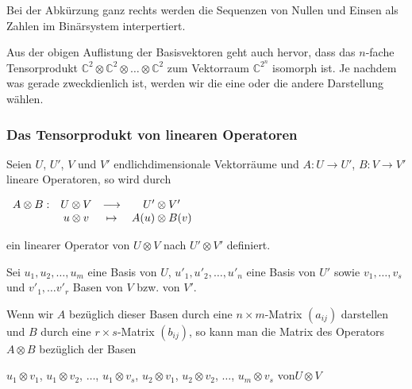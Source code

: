 \vspace{0.2cm}
\noindent Bei der Abkürzung ganz rechts werden die Sequenzen von Nullen und Einsen als Zahlen im Binärsystem interpertiert.

\noindent Aus der obigen Auflistung der Basisvektoren geht auch hervor, dass das $n$-fache Tensorprodukt $\mathbb{C}^2\otimes \mathbb{C}^2\otimes\ldots \otimes \mathbb{C}^2$ zum Vektorraum $\mathbb{C}^{2^n}$ isomorph ist. Je nachdem was gerade zweckdienlich ist, werden wir die eine oder die andere Darstellung wählen.


\vspace{0.3cm}
\subsubsection{Das Tensorprodukt von linearen Operatoren}

Seien $U$, $U'$, $V$ und $V'$ endlichdimensionale Vektorräume und $A\!: U \rightarrow U'$, $B\!:V\rightarrow V'$ lineare Operatoren, so wird durch 

\vspace{0.1cm}
\hspace{4cm}$\begin{array}{ l c c c}

A\otimes B:  &  U\otimes V & \longrightarrow & U'\otimes V' \\
& u\otimes v & \mapsto & A(u)\otimes B(v) \\

\end{array}$

\vspace{0.2cm}
\noindent ein linearer Operator von $U\otimes V$ nach $U'\otimes V'$ definiert.

\vspace{0.3cm}
Sei $u_1, u_2, \ldots , u_m$ eine Basis von $U$, $u'_1, u'_2, \ldots , u'_n$ eine Basis von $U'$ sowie $v_1, \ldots, v_s$ und $v'_1, \ldots v'_r$ Basen von $V$ bzw. von $V'$.

Wenn wir $A$ bezüglich dieser Basen durch eine $n\times m$-Matrix $(a_{ij})$ darstellen und $B$ durch eine $r\times s$-Matrix $(b_{ij})$, so kann  man die Matrix des Operators $A\otimes B$ bezüglich der Basen 

\vspace{0.2cm}
\hspace{1cm}$u_1\otimes v_1$, $u_1\otimes v_2$, $\ldots$, $u_1\otimes v_s$, $u_2\otimes v_1$, $u_2\otimes v_2$, $\ldots$, $u_m\otimes v_s$ \quad von\quad $U\otimes V$


